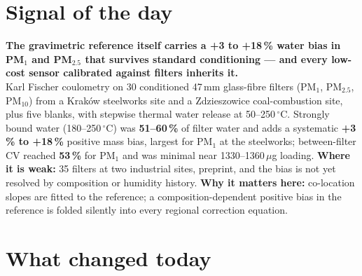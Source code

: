 \documentclass[10pt]{article}
\begin{document}
\vspace{6mm}

\section*{\sffamily\bfseries\color{Deep}Signal of the day}
\vspace{-1.5mm}{\color{Amber}\rule{\linewidth}{1.1pt}}\vspace{2.5mm}

\begin{keybox}
{\sffamily\bfseries\small\color{Deep}The gravimetric reference itself carries a +3 to +18\,\% water bias in PM$_1$
and PM$_{2.5}$ that survives standard conditioning --- and every low-cost sensor calibrated against filters inherits
it.}\\[1.4mm]
\footnotesize
Karl Fischer coulometry on 30 conditioned 47\,mm glass-fibre filters (PM$_1$, PM$_{2.5}$, PM$_{10}$) from a Krak\'ow
steelworks site and a Zdzieszowice coal-combustion site, plus five blanks, with stepwise thermal water release at
50--250\,$^\circ$C. Strongly bound water (180--250\,$^\circ$C) was \textbf{51--60\,\%} of filter water and adds a
systematic \textbf{+3\,\% to +18\,\%} positive mass bias, largest for PM$_1$ at the steelworks; between-filter CV
reached \textbf{53\,\%} for PM$_1$ and was minimal near 1330--1360\,$\mu$g loading.
\textbf{Where it is weak:} 35 filters at two industrial sites, preprint, and the bias is not yet resolved by
composition or humidity history.
\textbf{Why it matters here:} co-location slopes are fitted to the reference; a composition-dependent positive
bias in the reference is folded silently into every regional correction equation.\par
\end{keybox}

\vspace{3mm}

\section*{\sffamily\bfseries\color{Deep}What changed today}
\vspace{-1.5mm}{\color{Amber}\rule{\linewidth}{1.1pt}}\vspace{2.5mm}
\end{document}
